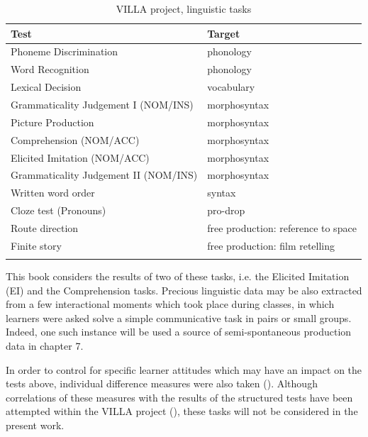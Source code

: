 \begin{table}
    \begin{tabularx}{\textwidth}{ll}
    \lsptoprule
        Test & Target\\
    \midrule
        Phoneme Discrimination & phonology\\
        Word Recognition & phonology\\
        Lexical Decision & vocabulary\\
        Grammaticality Judgement I (NOM/INS) & morphosyntax\\
        Picture Production & morphosyntax\\
        Comprehension (NOM/ACC) & morphosyntax\\
        Elicited Imitation (NOM/ACC) & morphosyntax\\
        Grammaticality Judgement II (NOM/INS) & morphosyntax\\
        Written word order & syntax\\
        Cloze test (Pronouns) & pro-drop\\
        Route direction & free production: reference to space\\
        Finite story \citep{Dimroth2012} & free production: film retelling\\
    \lspbottomrule
    \end{tabularx}
    \caption{VILLA project, linguistic tasks}
    \label{tab:02:9}
\end{table}

This book considers the results of two of these tasks, i.e. the Elicited Imitation (EI) and the Comprehension tasks. Precious linguistic data may be also extracted from a few interactional moments which took place during classes, in which learners were asked solve a simple communicative task in pairs or small groups. Indeed, one such instance will be used a source of semi-spontaneous production data in chapter 7. 

In order to control for specific learner attitudes which may have an impact on the tests above, individual difference measures were also taken (). Although correlations of these measures with the results of the structured tests have been attempted within the VILLA project (\citealt{WatorekSaturno2016, SaturnoWatorekInPrep}), these tasks will not be considered in the present work. 


